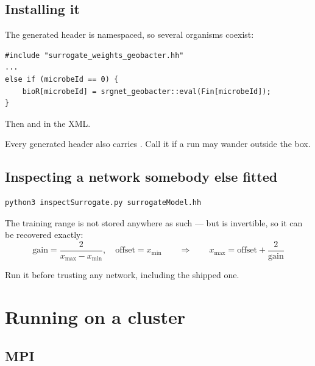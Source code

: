 \section{Installing it}


The generated header is namespaced, so several organisms coexist:

\begin{lstlisting}[style=cpp]
#include "surrogate_weights_geobacter.hh"
...
else if (microbeId == 0) {
    bioR[microbeId] = srgnet_geobacter::eval(Fin[microbeId]);
}
\end{lstlisting}

Then   and
  in the XML.

Every generated header also carries . Call it if a run
may wander outside the box.

\section{Inspecting a network somebody else fitted}

\begin{lstlisting}[style=sh]
python3 inspectSurrogate.py surrogateModel.hh
\end{lstlisting}

The training range is not stored anywhere as such --- but  is
invertible, so it can be recovered exactly:
\[
  \text{gain} = \frac{2}{x_{\max}-x_{\min}},\quad
  \text{offset} = x_{\min}
  \qquad\Longrightarrow\qquad
  x_{\max} = \text{offset} + \frac{2}{\text{gain}}
\]

Run it before trusting any network, including the shipped one.

\chapter{Running on a cluster}
\label{ch:cluster}

\section{MPI}

